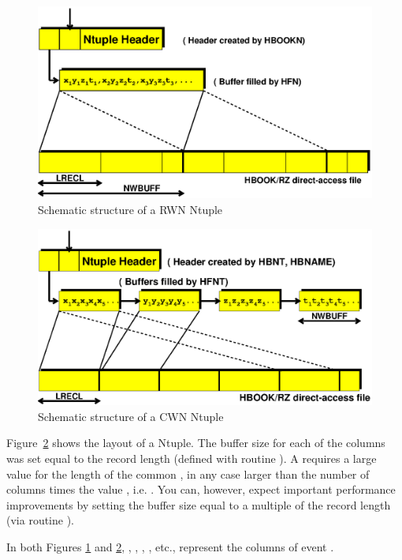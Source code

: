 \begin{htmlonly}
\begin{figure}
\begin{makeimage}
\includegraphics[width=\linewidth]{rwn.eps}
\end{makeimage}
\caption{Schematic structure of a RWN Ntuple}
\label{fig:rwn}
\end{figure}

\begin{figure}
\begin{makeimage}
\includegraphics[width=\linewidth]{cwn.eps}
\end{makeimage}
\caption{Schematic structure of a CWN Ntuple}
\label{fig:cwn}
\end{figure}

\newcommand{\III}{\(\sb{\mathtt{i}}\)}

Figure~\ref{fig:cwn} shows the layout of a \CWN{} Ntuple.
The buffer size for each of the columns
 was set equal to the record length 
(defined with routine ).
A \CWN{} requires a large value for the length of the common ,
in any case larger than the number of columns
times the value , i.e. .
You can, however, expect important performance improvements by setting
the buffer size  equal to a
multiple of the record length  (via routine ).

In both Figures \ref{fig:rwn} and \ref{fig:cwn}, \Lit{x\III},
\Lit{y\III}, \Lit{z\III}, \Lit{t\III}, etc., represent the columns of
event .
\end{htmlonly}

